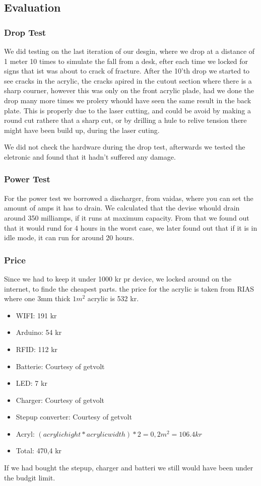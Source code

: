 \subsection{Evaluation}
\subsubsection{Drop Test}
We did testing on the last iteration of our desgin, where we drop at a distance of 1 meter 10 times to simulate the fall from a desk, efter each time we locked for signs that ist was about to crack of fracture.
After the 10'th drop we started to see cracks in the acrylic, the cracks apired in the cutout section where there is a sharp courner, however this was only on the front acrylic plade, had we done the drop many more times we prolery whould have seen the same result in the back plate. 
This is properly due to the laser cutting, and could be avoid by making a round cut rathere that a sharp cut, or by drilling a hule to relive tension there might have been build up, during the laser cuting.

We did not check the hardware during the drop test, afterwards we tested the eletronic and found that it hadn't suffered any damage.

\subsubsection{Power Test}
For the power test we borrowed a discharger, from vaidas, where you can set the amount of amps it has to drain.
We calculated that the devise whould drain around 350 milliamps, if it runs at maximum capacity.
From that we found out that it would rund for 4 hours in the worst case, we later found out that if it is in idle mode, it can run for around 20 hours.

\subsubsection{Price}
Since we had to keep it under 1000 kr pr device, we locked around on the internet, to finde the cheapest parts.
the price for the acrylic is taken from RIAS \cite{RIAS} where one 3mm thick $1 m^2$ acrylic is 532 kr.
\begin{itemize} \itemsep0em
	 \item WIFI: 191 kr \cite{Adafruit}
	 \item Arduino: 54 kr \cite{Sparkfun}
	 \item RFID: 112 kr \cite{Let-Eletronik}
	 \item Batterie: Courtesy of getvolt  \cite{Getvolt}
	 \item LED: 7 kr \cite{Adafruit}
	 \item Charger: Courtesy of getvolt \cite{Getvolt}
	 \item Stepup converter: Courtesy of getvolt  \cite{Getvolt}
	  \item Acryl: $(acrylic hight * acrylic width)*2 = 0,2 m^2 = 106.4 kr $ \cite{RIAS}
	 \item Total: 470,4 kr
\end{itemize}
If we had bought the stepup, charger and batteri we still would have been under the budgit limit.

